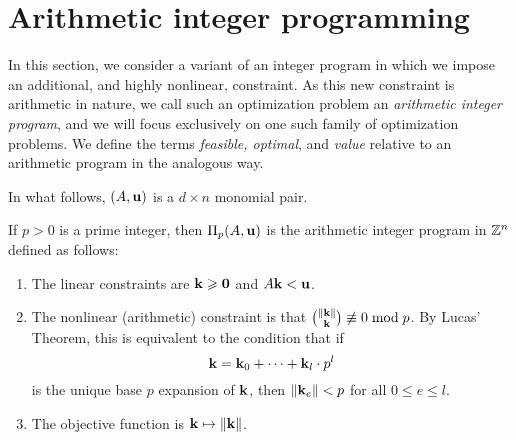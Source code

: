\documentclass[11pt]{amsart}
\renewcommand{\!}[1]{{\color{red}\text{$\star$\,}#1\,$\star$}}
\newcommand{\ol}[1]{\overline{#1}}
\begin{document}
%



\newpage
\section{Arithmetic integer programming}

In this section, we consider a variant of an integer program in which we impose an additional, and {highly} nonlinear, constraint.  As this new constraint is arithmetic in nature, we call such an optimization problem an \emph{arithmetic integer program}, and we will focus exclusively on one such family of optimization problems.  We define the terms \emph{feasible, optimal}, and \emph{value} relative to an arithmetic program in the analogous way.   

In what follows, $(A, \mathbf{u})$ is a $d \times n$ monomial pair.


\begin{definition} If $p>0$ is a prime integer, then $\Pi_p(A, \mathbf{u})$ is the arithmetic integer program in $\mathbb{Z}^n$ defined as follows:
\begin{enumerate}
\item The linear constraints are $\mathbf{k} \geqslant \mathbf{0}$ and $A \mathbf{k} < \mathbf{u}$.  
\item The nonlinear (arithmetic) constraint is that $\binom{\| \mathbf{k} \|}{\mathbf{k}} \not \equiv 0 \bmod p$.  By Lucas' Theorem, this is equivalent to the condition that  if \[ \mathbf{k} = \mathbf{k}_0 + \cdots + \mathbf{k}_l \cdot  p^l\] is the unique base $p$ expansion of $\mathbf{k}$, then $\| \mathbf{k}_e \| < p$ for all $0 \leq e \leq l $.
\item The objective function is $\mathbf{k} \mapsto \| \mathbf{k} \|$.
\end{enumerate}

\end{definition}
\end{document}
